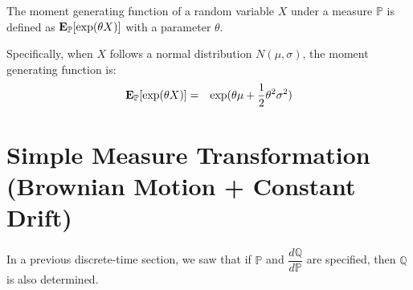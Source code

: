 \documentclass[uplatex,a4j,12pt,dvipdfmx]{jsarticle}
\begin{document}
The moment generating function of a random variable $X$ under a measure $\mathbb{P}$ is defined as ${\bf E}_{\mathbb{P}}[ \exp( \theta X ) ]$ with a parameter $\theta$.

Specifically, when $X$ follows a normal distribution $N(\mu ,\sigma)$, the moment generating function is:
%
\begin{eqnarray*}
	{\bf E}_{\mathbb{P}}[ \exp( \theta X ) ]
	&=&
	\exp( \theta \mu + \dfrac{1}{2} \theta^{2} \sigma^{2} )
\end{eqnarray*}
%

\section{Simple Measure Transformation (Brownian Motion + Constant Drift)}

In a previous discrete-time section, we saw that if $\mathbb{P}$ and $\dfrac{ d \mathbb{Q} }{ d \mathbb{P} }$ are specified, then $\mathbb{Q}$ is also determined.
\end{document}

